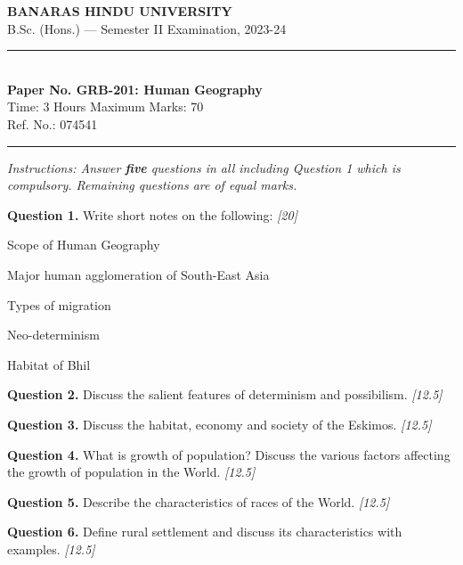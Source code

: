\documentclass[11pt,a4paper]{article}
\newcommand{\pts}[1]{\hfill   \textit{[#1]}}
\begin{document}
\begin{center}
  {\large\bfseries BANARAS HINDU UNIVERSITY}\\[2pt]
  {\normalsize B.Sc. (Hons.) --- Semester II Examination, 2023-24}\\[6pt]
  \rule{0.8\linewidth}{0.5pt}\\[6pt]
  {\large\bfseries Paper No. GRB-201: Human Geography}\\[4pt]
  {\normalsize Time: 3 Hours \hfill Maximum Marks: 70}\\[2pt]
  {\small Ref. No.: 074541}
\end{center}
\rule{\linewidth}{0.4pt}
\smallskip



\noindent   \textit{Instructions: Answer   \textbf{five} questions in all including Question 1 which is compulsory. Remaining questions are of equal marks.}
\bigskip




\noindent   \textbf{Question 1.} Write short notes on the following: \pts{20}

\begin{parts}
  \item Scope of Human Geography
  \item Major human agglomeration of South-East Asia
  \item Types of migration
  \item Neo-determinism
  \item Habitat of Bhil
\end{parts}

\medskip


\noindent   \textbf{Question 2.} Discuss the salient features of determinism and possibilism. \pts{12.5}

\medskip


\noindent   \textbf{Question 3.} Discuss the habitat, economy and society of the Eskimos. \pts{12.5}

\medskip


\noindent   \textbf{Question 4.} What is growth of population? Discuss the various factors affecting the growth of population in the World. \pts{12.5}

\medskip


\noindent   \textbf{Question 5.} Describe the characteristics of races of the World. \pts{12.5}

\medskip


\noindent   \textbf{Question 6.} Define rural settlement and discuss its characteristics with examples. \pts{12.5}
\end{document}
